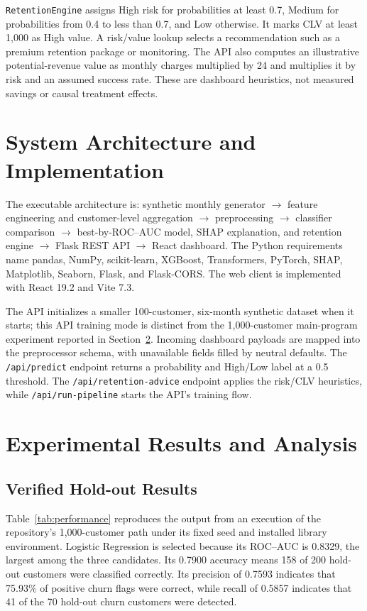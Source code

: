 \documentclass[conference]{IEEEtran}
\begin{document}
\texttt{RetentionEngine} assigns High risk for probabilities at least 0.7, Medium for probabilities from 0.4 to less than 0.7, and Low otherwise. It marks CLV at least 1,000 as High value. A risk/value lookup selects a recommendation such as a premium retention package or monitoring. The API also computes an illustrative potential-revenue value as monthly charges multiplied by 24 and multiplies it by risk and an assumed success rate. These are dashboard heuristics, not measured savings or causal treatment effects.

\section{System Architecture and Implementation}
The executable architecture is: synthetic monthly generator $\rightarrow$ feature engineering and customer-level aggregation $\rightarrow$ preprocessing $\rightarrow$ classifier comparison $\rightarrow$ best-by-ROC--AUC model, SHAP explanation, and retention engine $\rightarrow$ Flask REST API $\rightarrow$ React dashboard. The Python requirements name pandas, NumPy, scikit-learn, XGBoost, Transformers, PyTorch, SHAP, Matplotlib, Seaborn, Flask, and Flask-CORS. The web client is implemented with React 19.2 and Vite 7.3.

The API initializes a smaller 100-customer, six-month synthetic dataset when it starts; this API training mode is distinct from the 1,000-customer main-program experiment reported in Section~\ref{sec:results}. Incoming dashboard payloads are mapped into the preprocessor schema, with unavailable fields filled by neutral defaults. The \texttt{/api/predict} endpoint returns a probability and High/Low label at a 0.5 threshold. The \texttt{/api/retention-advice} endpoint applies the risk/CLV heuristics, while \texttt{/api/run-pipeline} starts the API's training flow.

\section{Experimental Results and Analysis}\label{sec:results}
\subsection{Verified Hold-out Results}
Table~\ref{tab:performance} reproduces the output from an execution of the repository's 1,000-customer path under its fixed seed and installed library environment. Logistic Regression is selected because its ROC--AUC is 0.8329, the largest among the three candidates. Its 0.7900 accuracy means 158 of 200 hold-out customers were classified correctly. Its precision of 0.7593 indicates that 75.93\% of positive churn flags were correct, while recall of 0.5857 indicates that 41 of the 70 hold-out churn customers were detected.
\end{document}
